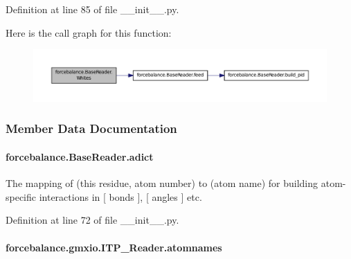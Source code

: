 Definition at line 85 of file \-\_\-\-\_\-init\-\_\-\-\_\-.\-py.



Here is the call graph for this function\-:\nopagebreak
\begin{figure}[H]
\begin{center}
\leavevmode
\includegraphics[width=350pt]{classforcebalance_1_1BaseReader_af2af8a559625614474a1c6fe245b5e13_cgraph}
\end{center}
\end{figure}




\subsubsection{Member Data Documentation}
\hypertarget{classforcebalance_1_1BaseReader_a2c46ad6b66cf09a30e917ce4a1997e2a}{
\paragraph[{adict}]{\setlength{\rightskip}{0pt plus 5cm}forcebalance.\-Base\-Reader.\-adict\hspace{0.3cm}{\ttfamily [inherited]}}}\label{classforcebalance_1_1BaseReader_a2c46ad6b66cf09a30e917ce4a1997e2a}


The mapping of (this residue, atom number) to (atom name) for building atom-\/specific interactions in \mbox{[} bonds \mbox{]}, \mbox{[} angles \mbox{]} etc. 



Definition at line 72 of file \-\_\-\-\_\-init\-\_\-\-\_\-.\-py.

\hypertarget{classforcebalance_1_1gmxio_1_1ITP__Reader_a0cbe42a9c0bf233255cfb8dd6ebe102e}{
\paragraph[{atomnames}]{\setlength{\rightskip}{0pt plus 5cm}forcebalance.\-gmxio.\-I\-T\-P\-\_\-\-Reader.\-atomnames}}\label{classforcebalance_1_1gmxio_1_1ITP__Reader_a0cbe42a9c0bf233255cfb8dd6ebe102e}


